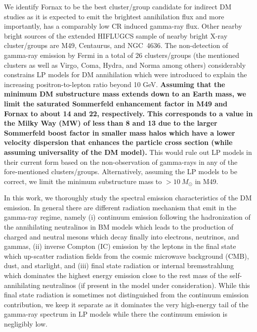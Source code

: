 \documentclass[10pt,aps,pra,reprint,amsmath,amsfonts,amssymb,showpacs,nofootinbib,floatfix]{revtex4-1}
\def\del#1{{}}
\def\C#1{{\bf #1}}
\newcommand{\msun}{M_\odot}
\begin{document}
We identify Fornax to be the best cluster/group candidate for indirect
DM studies as it is expected to emit the brightest annihilation flux
and more importantly, has a comparably low CR induced gamma-ray flux.
\del{This in principle should allow to detect or constrain some BM
  models that have been chosen for the large gamma-ray flux yield with
  three-year Fermi data (or constrain the substructure boost factor).}
Other nearby bright sources of the extended HIFLUGCS sample of nearby
bright X-ray cluster/groups are M49, Centaurus, and NGC~4636.  The
non-detection of gamma-ray emission by Fermi in a total of 26
clusters/groups (the mentioned clusters as well as Virgo, Coma, Hydra,
and Norma among others) considerably constrains LP models for DM
annihilation which were introduced to explain the increasing
positron-to-lepton ratio beyond 10 GeV. \C{Assuming that the minimum
  DM substructure mass extends down to an Earth mass, we limit the
  saturated Sommerfeld enhancement factor in M49 and Fornax to about
  14 and 22, respectively. This corresponds to a value in the Milky
  Way (MW) of less than 8 and 13 due to the larger Sommerfeld boost
  factor in smaller mass halos which have a lower velocity dispersion
  that enhances the particle cross section (while assuming
  universality of the DM model).} This would rule out LP models in
  their current form based on the non-observation of gamma-rays in any
  of the fore-mentioned clusters/groups. Alternatively, assuming the
  LP models to be correct, we limit the minimum substructure mass to
  $>10~\msun$ in M49.

In this work, we thoroughly study the spectral emission
characteristics of the DM emission. In general there are different
radiation mechanism that emit in the gamma-ray regime, namely (i)
continuum emission following the hadronization of the annihilating
neutralinos in BM models which leads to the production of charged and
neutral mesons which decay finally into electrons, neutrinos, and
gammas, (ii) inverse Compton (IC) emission by the leptons in the final
state which up-scatter radiation fields from the cosmic microwave
background (CMB), dust, and starlight, and (iii) final state radiation
or internal bremsstrahlung which dominates the highest energy emission
close to the rest mass of the self-annihilating neutralinos (if
present in the model under consideration). While this final state
radiation is sometimes not distinguished from the continuum emission
contribution, we keep it separate as it dominates the very high-energy
tail of the gamma-ray spectrum in LP models while there the continuum
emission is negligibly low.
\end{document}
